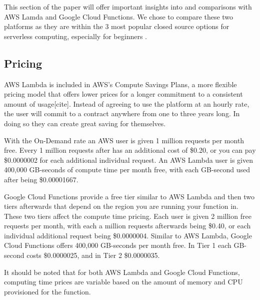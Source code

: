\documentclass[10pt, conference]{IEEEtran}
\begin{document}
This section of the paper will offer important insights into and comparisons with AWS Lamda and Google Cloud Functions. We chose to compare these two platforms as they are within the 3 most popular closed source options for serverless computing, especially for beginners \cite{b4}. 

\subsection{Pricing}

AWS Lambda is included in AWS's Compute Savings Plans, a more flexible pricing model that offers lower prices for a longer commitment to a consistent amount of usage[cite]. Instead of agreeing to use the platform at an hourly rate, the user will commit to a contract anywhere from one to three years long. In doing so they can create great saving for themselves. 

With the On-Demand rate an AWS user is given 1 million requests per month free. Every 1 million requests after has an additional cost of \$0.20, or you can pay \$0.0000002 for each additional individual request. An AWS Lambda user is given 400,000 GB-seconds of compute time per month free, with each GB-second used after being \$0.00001667. 

Google Cloud Functions provide a free tier similar to AWS Lambda and then two tiers afterwards that depend on the region you are running your function in. These two tiers affect the compute time pricing. Each user is given 2 million free requests per month, with each a million requests afterwards being \$0.40, or each individual additional request being \$0.0000004. Similar to AWS Lambda, Google Cloud Functions offers 400,000 GB-seconds per month free. In Tier 1 each GB-second costs \$0.0000025, and in Tier 2 \$0.0000035. 

It should be noted that for both AWS Lambda and Google Cloud Functions, computing time prices are variable based on the amount of memory and CPU provisioned for the function. 
\end{document}
